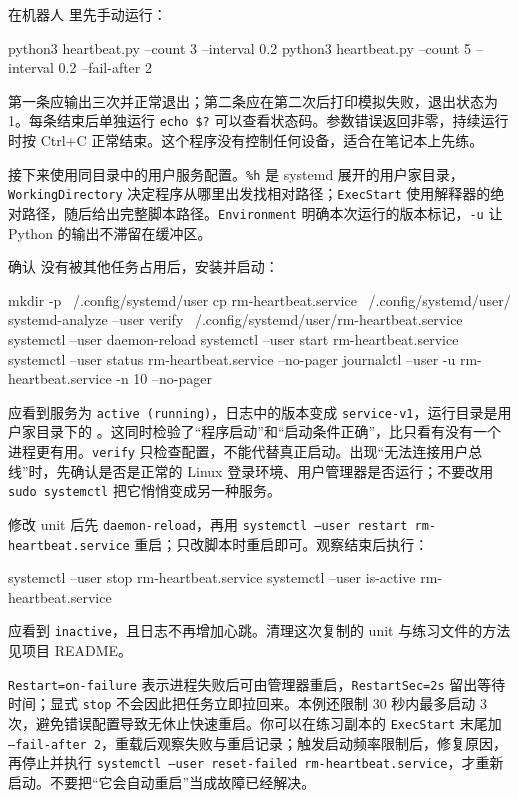 \begin{example}
在机器人  里先手动运行：
\begin{tbash}
python3 heartbeat.py --count 3 --interval 0.2
python3 heartbeat.py --count 5 --interval 0.2 --fail-after 2
\end{tbash}
第一条应输出三次并正常退出；第二条应在第二次后打印模拟失败，退出状态为 1。每条结束后单独运行 \texttt{echo \$?} 可以查看状态码。参数错误返回非零，持续运行时按 Ctrl+C 正常结束。这个程序没有控制任何设备，适合在笔记本上先练。

接下来使用同目录中的用户服务配置。\texttt{\%h} 是 systemd 展开的用户家目录，\texttt{WorkingDirectory} 决定程序从哪里出发找相对路径；\texttt{ExecStart} 使用解释器的绝对路径，随后给出完整脚本路径。\texttt{Environment} 明确本次运行的版本标记，\texttt{-u} 让 Python 的输出不滞留在缓冲区。

确认  没有被其他任务占用后，安装并启动：
\begin{tbash}
mkdir -p ~/.config/systemd/user
cp rm-heartbeat.service ~/.config/systemd/user/
systemd-analyze --user verify ~/.config/systemd/user/rm-heartbeat.service
systemctl --user daemon-reload
systemctl --user start rm-heartbeat.service
systemctl --user status rm-heartbeat.service --no-pager
journalctl --user -u rm-heartbeat.service -n 10 --no-pager
\end{tbash}
应看到服务为 \texttt{active (running)}，日志中的版本变成 \texttt{service-v1}，运行目录是用户家目录下的 。这同时检验了“程序启动”和“启动条件正确”，比只看有没有一个进程更有用。\texttt{verify} 只检查配置，不能代替真正启动。出现“无法连接用户总线”时，先确认是否是正常的 Linux 登录环境、用户管理器是否运行；不要改用 \texttt{sudo systemctl} 把它悄悄变成另一种服务。

修改 unit 后先 \texttt{daemon-reload}，再用 \texttt{systemctl --user restart rm-heartbeat.service} 重启；只改脚本时重启即可。观察结束后执行：
\begin{tbash}
systemctl --user stop rm-heartbeat.service
systemctl --user is-active rm-heartbeat.service
\end{tbash}
应看到 \texttt{inactive}，且日志不再增加心跳。清理这次复制的 unit 与练习文件的方法见项目 README。
\end{example}

\texttt{Restart=on-failure} 表示进程失败后可由管理器重启，\texttt{RestartSec=2s} 留出等待时间；显式 \texttt{stop} 不会因此把任务立即拉回来。本例还限制 30 秒内最多启动 3 次，避免错误配置导致无休止快速重启。你可以在练习副本的 \texttt{ExecStart} 末尾加 \texttt{--fail-after 2}，重载后观察失败与重启记录；触发启动频率限制后，修复原因，再停止并执行 \texttt{systemctl --user reset-failed rm-heartbeat.service}，才重新启动。不要把“它会自动重启”当成故障已经解决。

